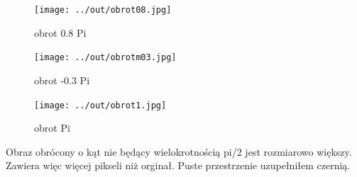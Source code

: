 \documentclass[a4paper,12pt]{article}
\begin{document}
\begin{figure}[h!]
\begin{minipage}[t]{5cm}
\begin{center}
\texttt{[image: ../out/obrot08.jpg]}
\caption{obrot 0.8 Pi}
\end{center}
\end{minipage}
\hfill
\begin{minipage}[t]{5cm}
\begin{center}
\texttt{[image: ../out/obrotm03.jpg]}
\caption{obrot -0.3 Pi}
\end{center}
\end{minipage}
\hfill
\begin{minipage}[t]{5cm}
\begin{center}
\texttt{[image: ../out/obrot1.jpg]}
\caption{obrot Pi}
\end{center}
\end{minipage}
\end{figure}

Obraz obrócony o kąt nie będący wielokrotnością pi/2 jest rozmiarowo większy. Zawiera więc więcej pikseli niż orginał. Puste przestrzenie uzupełniłem czernią.
\end{document}
